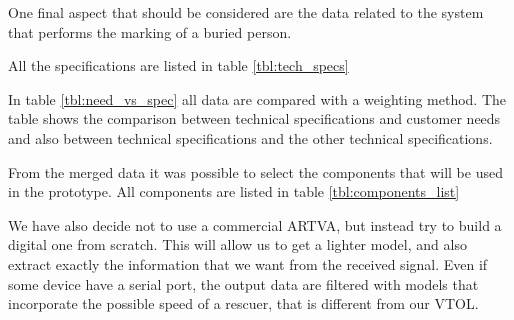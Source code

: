 One final aspect that should be considered are the data related to the system that performs the marking of a buried person.

All the specifications are listed in table \ref{tbl:tech_specs}


In table \ref{tbl:need_vs_spec} all data are compared with a weighting method. The table shows the comparison between technical specifications and customer needs and also between technical specifications and the other technical specifications.

From the merged data it was possible to select the components that will be used in the prototype. All components are listed in table \ref{tbl:components_list}

We have also decide not to use a commercial ARTVA, but instead try to build a digital one from scratch. This will allow us to get a lighter model, and also extract exactly the information that we want from the received signal. Even if some device have a serial port, the output data are filtered with models that incorporate the possible speed of a rescuer, that is different from our VTOL.




\FloatBarrier
